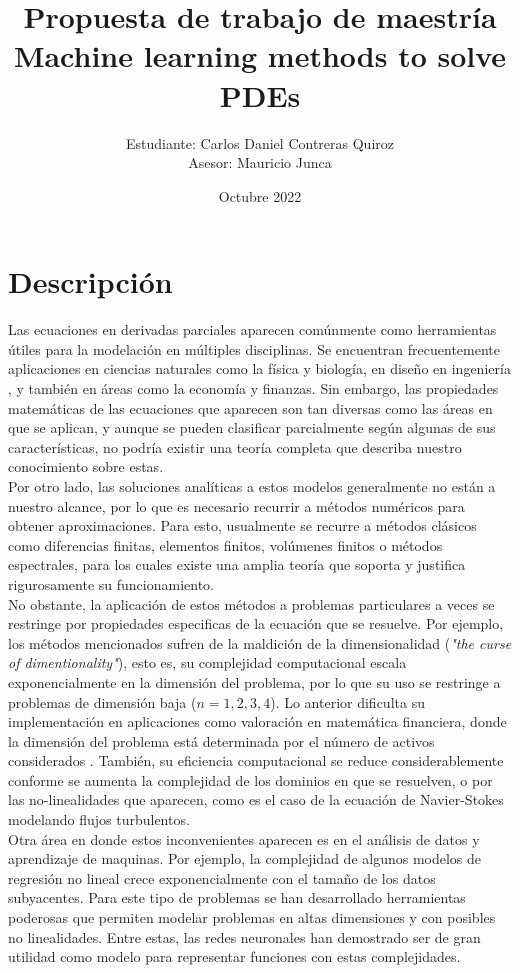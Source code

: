 \documentclass[a4paper,11pt]{scrartcl}
\title{Propuesta de trabajo de maestría\\
	Machine learning methods to solve PDEs}
\author{Estudiante: Carlos Daniel Contreras Quiroz\\	
	Asesor: Mauricio Junca}
\date{Octubre 2022}
\begin{document}
	
	\maketitle
	
	
	\section{Descripción}
	Las ecuaciones en derivadas parciales aparecen comúnmente como herramientas útiles para la modelación en múltiples disciplinas. Se encuentran frecuentemente aplicaciones en ciencias naturales como la física y biología, en diseño en ingeniería , y también en áreas como la economía y finanzas. Sin embargo, las propiedades matemáticas de las ecuaciones que aparecen son tan diversas como las áreas en que se aplican, y aunque se pueden clasificar parcialmente según algunas de sus características, no podría existir una teoría completa que describa nuestro conocimiento sobre estas.\\
	
	Por otro lado, las soluciones analíticas a estos modelos generalmente no están a nuestro alcance, por lo que es necesario recurrir a métodos numéricos para obtener aproximaciones. Para esto, usualmente se recurre a métodos clásicos como diferencias finitas, elementos finitos, volúmenes finitos o métodos espectrales, para los cuales existe una amplia teoría que soporta y justifica rigurosamente su funcionamiento.\\
	
	No obstante, la aplicación de estos métodos a problemas particulares a veces se restringe por propiedades especificas de la ecuación que se resuelve. Por ejemplo, los métodos mencionados sufren de la maldición de la dimensionalidad (\textit{"the curse of dimentionality"}), esto es, su complejidad computacional escala exponencialmente en la dimensión del problema, por lo que su uso se restringe a problemas de dimensión baja ($n=1,2,3,4$). Lo anterior dificulta su implementación en aplicaciones como valoración en matemática financiera, donde la dimensión del problema está determinada por el número de activos considerados . También, su eficiencia computacional se reduce considerablemente conforme se aumenta la complejidad de los dominios en que se resuelven, o por las no-linealidades que aparecen, como es el caso de la ecuación de Navier-Stokes modelando flujos turbulentos.\\
	
	Otra área en donde estos inconvenientes aparecen es en el análisis de datos y aprendizaje de maquinas. Por ejemplo, la complejidad de algunos modelos de regresión no lineal crece exponencialmente con el tamaño de los datos subyacentes. Para este tipo de problemas se han desarrollado herramientas poderosas que permiten modelar problemas en altas dimensiones y con posibles no linealidades. Entre estas, las redes neuronales han demostrado ser de gran utilidad como modelo para representar funciones con estas complejidades\cite{higham_deep_2019}.\\
	
\end{document}
